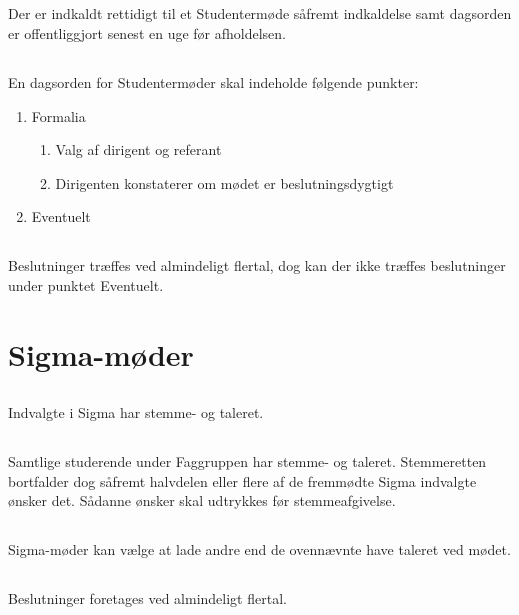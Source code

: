 \documentclass[danish,a4paper,twocolumn]{article}
\begin{document}
\subsection{}\label{stk:studmd-rettidig}Der er indkaldt rettidigt til et Studentermøde såfremt indkaldelse samt dagsorden er offentliggjort senest en uge før afholdelsen.
\subsection{}En dagsorden for Studentermøder skal indeholde følgende punkter:
\begin{enumerate}
        \item Formalia
        \begin{enumerate}
                \item Valg af dirigent og referant
                \item Dirigenten konstaterer om mødet er beslutningsdygtigt
        \end{enumerate}
        \item Eventuelt
\end{enumerate}
\subsection{}Beslutninger træffes ved almindeligt flertal, dog kan der ikke træffes beslutninger under punktet Eventuelt.

\section{Sigma-møder}\label{par:sigmamdr}
\subsection{}Indvalgte i Sigma har stemme- og taleret.
\subsection{}Samtlige studerende under Faggruppen har stemme- og taleret. Stemmeretten bortfalder dog såfremt halvdelen eller flere af de fremmødte Sigma indvalgte ønsker det. Sådanne ønsker skal udtrykkes før stemmeafgivelse.
\subsection{}Sigma-møder kan vælge at lade andre end de ovennævnte have taleret ved mødet.
\subsection{}Beslutninger foretages ved almindeligt flertal.
\end{document}
